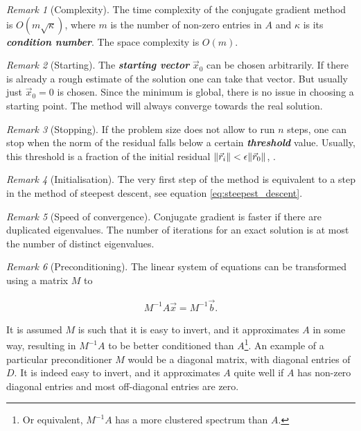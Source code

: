 \documentclass{article}
\theoremstyle{plain} %
\theoremstyle{convention} %
\theoremstyle{remark} %
\newtheorem*{remark}{Remark} %
\def\df#1{\textbf{\textit{#1}}}
\numberwithin{equation}{section}
\begin{document}
\begin{remark}[Complexity]
    The time complexity of the conjugate gradient method is $O(m \sqrt{\kappa})$, where $m$ is the number of non-zero entries in $A$ and $\kappa$ is its \df{condition number}. The space complexity is $O(m)$.
\end{remark}

\begin{remark}[Starting]
    The \df{starting vector} $\vec{x}_0$ can be chosen arbitrarily. If there is already a rough estimate of the solution one can take that vector. But usually just $\vec{x}_0 = 0$ is chosen. Since the minimum is global, there is no issue in choosing a starting point. The method will always converge towards the real solution.
\end{remark}

\begin{remark}[Stopping]
    If the problem size does not allow to run $n$ steps, one can stop when the norm of the residual falls below a certain \df{threshold} value. Usually, this threshold is a fraction of the initial residual $\norm{\vec{r}_i} < \epsilon \norm{\vec{r}_0}$, \cite{shewchuk1994}.
\end{remark}

\begin{remark}[Initialisation]
    The very first step of the method is equivalent to a step in the method of steepest descent, see equation \eqref{eq:steepest_descent}.
\end{remark}

\begin{remark}[Speed of convergence]
    Conjugate gradient is faster if there are duplicated eigenvalues. The number of iterations for an exact solution is at most the number of distinct eigenvalues.
\end{remark}

\begin{remark}[Preconditioning]
    The linear system of equations can be transformed using a matrix $M$ to

    \begin{align*}
        M^{-1} A \vec{x} = M^{-1} \vec{b}.
    \end{align*}

    It is assumed $M$ is such that it is easy to invert, and it approximates $A$ in some way, resulting in $M^{-1} A$ to be better conditioned than $A$\footnote{Or equivalent, $M^{-1}A$ has a more clustered spectrum than $A$.}. An example of a particular preconditioner $M$ would be a diagonal matrix, with diagonal entries of $D$. It is indeed easy to invert, and it approximates $A$ quite well if $A$ has non-zero diagonal entries and most off-diagonal entries are zero.
\end{remark}
\end{document}
